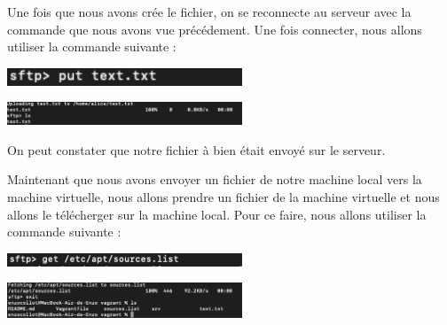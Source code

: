 \documentclass[12pt]{article}
\begin{document}
Une fois que nous avons crée le fichier, on se reconnecte au serveur avec la commande que nous avons vue précédement. Une fois connecter, nous allons utiliser la commande suivante : 

\vspace{0.3cm}

\begin{center}
  \includegraphics[width=7cm]{Image-TD-SSH-4/fichier-envoyer.png}
\end{center}

\vspace{0.3cm}

\begin{center}
  \includegraphics[width=7cm]{Image-TD-SSH-4/commande-reussite.png}
\end{center}

\vspace{0.3cm}

On peut constater que notre fichier à bien était envoyé sur le serveur. 

\vspace{0.3cm}

Maintenant que nous avons envoyer un fichier de notre machine local vers la machine virtuelle, nous allons prendre un fichier de la machine virtuelle et nous allons le télécherger sur la machine local. Pour ce faire, nous allons utiliser la commande suivante : 

\vspace{0.3cm}

\begin{center}
  \includegraphics[width=7cm]{Image-TD-SSH-4/commande-puts.png}
\end{center}

\vspace{0.3cm}

\begin{center}
  \includegraphics[width=7cm]{Image-TD-SSH-4/commande-puts-2.png}
\end{center}
\end{document}
